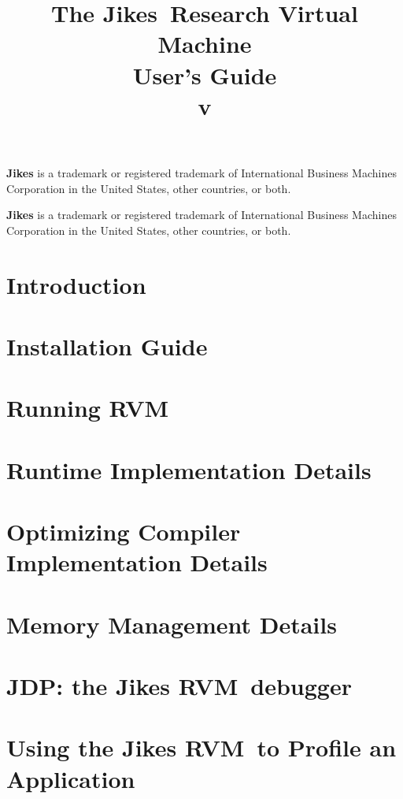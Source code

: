 \documentclass{article}
\title{\texonly{\vfill} {\huge The Jikes\JikesTMFootnote\ Research Virtual
Machine
\\
User's Guide} \\ {\huge v\version} \\ { } \texonly{\vfill} }
\newcommand{\JikesTMFooter}{\W \small {\bf Jikes} is a
trademark or registered trademark of International Business Machines
Corporation in the United States, other countries, or both.}
\newcommand{\jrvm}{Jikes RVM}
\begin{document}
\maketitle
\date{}

\T \JikesTMFooter

\T \newpage
\label{hlxtoc}
\T \tableofcontents
\T \listoffigures
\W {}

\W \JikesTMFooter

\T \newpage
\section{Introduction}


\T \newpage
{}
\section{Installation Guide} \label{section:installation}


\T \newpage
\section{Running RVM} \label{section:running}


\T \newpage
\section{Runtime Implementation Details}


\T \newpage
\section{Optimizing Compiler Implementation Details}
\label{section:optdetails}


\T \newpage
\section{Memory Management Details}


\T \newpage
\section{JDP: the \jrvm\ debugger}


\T \newpage
\section{Using the \jrvm\ to Profile an Application}

\end{document}
